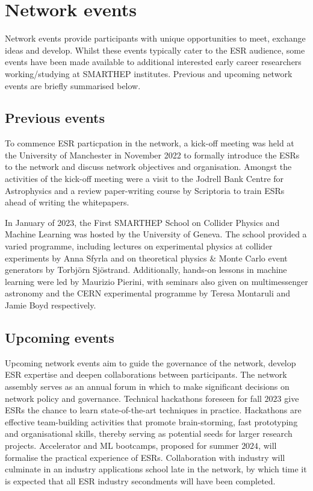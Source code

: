 \section{Network events}
\label{events}
Network events provide participants with unique opportunities to meet, exchange ideas and develop. Whilst these events typically cater to the ESR audience, some events have been made available to additional interested early career researchers working/studying at SMARTHEP institutes. Previous and upcoming network events are briefly summarised below.

\subsection{Previous events}
\label{previous-events}
To commence ESR particpation in the network, a kick-off meeting was held at the University of Manchester in November 2022 to formally introduce the ESRs to the network and discuss network objectives and organisation. Amongst the activities of the kick-off meeting were a visit to the Jodrell Bank Centre for Astrophysics and a review paper-writing course by Scriptoria to train ESRs ahead of writing the whitepapers.\par 

In January of 2023, the First SMARTHEP School on Collider Physics and Machine Learning was hosted by the University of Geneva. The school provided a varied programme, including lectures on experimental physics at collider experiments by Anna Sfyrla and on theoretical physics \& Monte Carlo event generators by Torbj\"orn Sj\"ostrand. Additionally, hands-on lessons in machine learning were led by Maurizio Pierini, with seminars also given on multimessenger astronomy and the CERN experimental programme by Teresa Montaruli and Jamie Boyd respectively.

\subsection{Upcoming events}
\label{upcoming-events}
Upcoming network events aim to guide the governance of the network, develop ESR expertise and deepen collaborations between participants. The network assembly serves as an annual forum in which to make significant decisions on network policy and governance. Technical hackathons foreseen for fall $2023$ give ESRs the chance to learn state-of-the-art techniques in practice. Hackathons are effective team-building activities that promote brain-storming, fast prototyping and organisational skills, thereby serving as potential seeds for larger research projects. Accelerator and ML bootcamps, proposed for summer $2024$, will formalise the practical experience of ESRs. Collaboration with industry will culminate in an industry applications school late in the network, by which time it is expected that all ESR industry secondments will have been completed.

